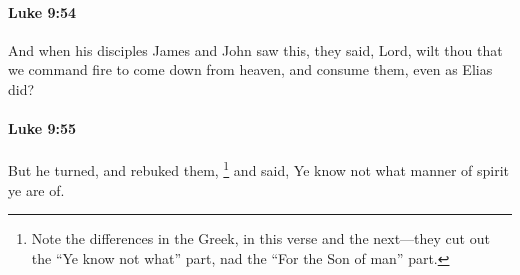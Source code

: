 		\paragraph{Luke 9:54} %
			\label{LUKE-9-54}

			And when his disciples James and John saw this, they said, Lord, wilt thou that we command fire to come down from heaven, and consume them, even as Elias did?

			\begin{framed}
			\scriptsize
				\begin{compactdesc}
					\item[SBLG] 
				\end{compactdesc}
			\end{framed}

		\paragraph{Luke 9:55} %
			\label{LUKE-9-55}

			But he turned, and rebuked them,
				\footnote{%
					Note the differences in the Greek, in this verse and the next---they cut out the ``Ye know not what'' part, nad the ``For the Son of man'' part.
					}%
			and said, Ye know not what manner of spirit ye are of. 

